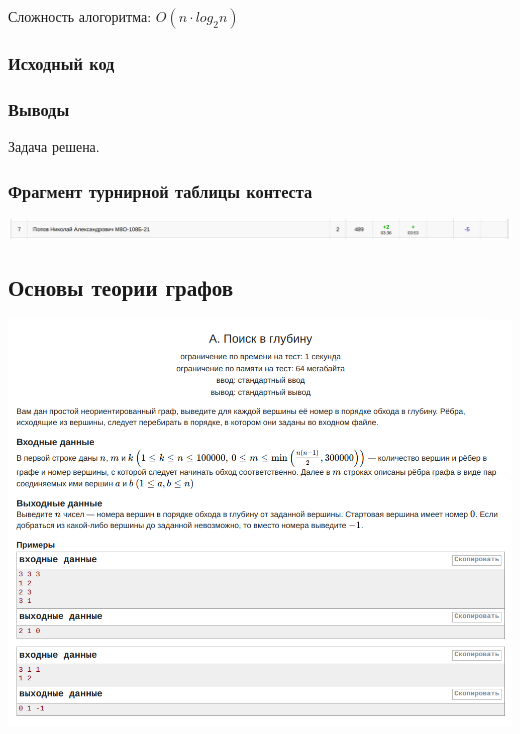 Сложность алогоритма: $O(n \cdot log_2 n)$ 

\subsubsection*{Исходный код}


\subsubsection*{Выводы}
Задача решена.

\subsubsection*{Фрагмент турнирной таблицы контеста}
\begin{center}
\includegraphics[width=\textwidth]{standings/Contest6.png}\newline\noindent
\end{center}


\subsection*{Основы теории графов}

\begin{center}
\includegraphics[width=\textwidth]{statements/Contest7A.png}
\end{center}

